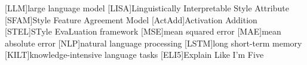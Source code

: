 

\begin{acronym}[ActAdd] %
  [LLM]{large language model}
  [LISA]{Linguistically Interpretable Style Attribute}
  [SFAM]{Style Feature Agreement Model}
  [ActAdd]{Activation Addition}
  [STEL]{STyle EvaLuation framework}
  [MSE]{mean squared error}
  [MAE]{mean absolute error}
  [NLP]{natural language processing}
  [LSTM]{long short-term memory}
  [KILT]{knowledge-intensive language tasks}
  [ELI5]{Explain Like I'm Five}
\end{acronym}